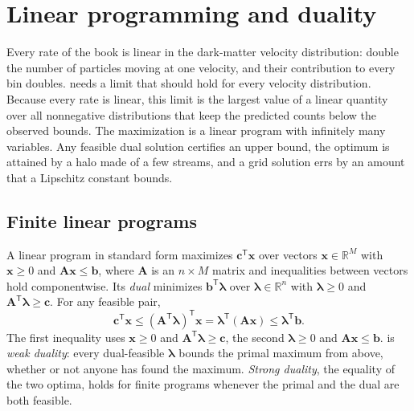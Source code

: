 \section{Linear programming and duality}\label{app:C.12}

Every rate of the book is linear in the dark-matter velocity distribution: double the number of particles moving at one velocity, and their contribution to every bin doubles.  needs a limit that should hold for every velocity distribution. Because every rate is linear, this limit is the largest value of a linear quantity over all nonnegative distributions that keep the predicted counts below the observed bounds. The maximization is a linear program with infinitely many variables. Any feasible dual solution certifies an upper bound, the optimum is attained by a halo made of a few streams, and a grid solution errs by an amount that a Lipschitz constant bounds.

\subsection{Finite linear programs}

A linear program in standard form maximizes $\mathbf{c}^{\mathsf{T}}\mathbf{x}$ over vectors $\mathbf{x} \in \mathbb{R}^M$ with $\mathbf{x} \ge 0$ and $\mathbf{A}\mathbf{x} \le \mathbf{b}$, where $\mathbf{A}$ is an $n\times M$ matrix and inequalities between vectors hold componentwise. Its \emph{dual} minimizes $\mathbf{b}^{\mathsf{T}}\boldsymbol{\lambda}$ over $\boldsymbol{\lambda} \in \mathbb{R}^n$ with $\boldsymbol{\lambda} \ge 0$ and $\mathbf{A}^{\mathsf{T}}\boldsymbol{\lambda} \ge \mathbf{c}$. For any feasible pair,
\begin{equation}
  \mathbf{c}^{\mathsf{T}}\mathbf{x} \le (\mathbf{A}^{\mathsf{T}}\boldsymbol{\lambda})^{\mathsf{T}}\mathbf{x} = \boldsymbol{\lambda}^{\mathsf{T}}(\mathbf{A}\mathbf{x}) \le \boldsymbol{\lambda}^{\mathsf{T}}\mathbf{b} .
  \label{eq:C.12-weak}
\end{equation}
The first inequality uses $\mathbf{x} \ge 0$ and $\mathbf{A}^{\mathsf{T}}\boldsymbol{\lambda} \ge \mathbf{c}$, the second $\boldsymbol{\lambda} \ge 0$ and $\mathbf{A}\mathbf{x} \le \mathbf{b}$.  is \emph{weak duality}: every dual-feasible $\boldsymbol{\lambda}$ bounds the primal maximum from above, whether or not anyone has found the maximum. \emph{Strong duality}, the equality of the two optima, holds for finite programs whenever the primal and the dual are both feasible.

